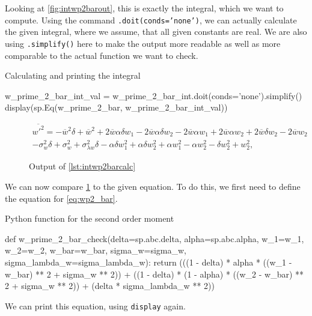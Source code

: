 Looking at \cref{fig:intwp2barout}, this is exactly the integral, which we want to compute.
Using the command \texttt{.doit(conds='none')}, we can actually calculate the given integral, where we assume, that all given constants are real.
We are also using \texttt{.simplify()} here to make the output more readable as well as more comparable to the actual function we want to check.
\begin{listing}[!ht]
    \caption{Calculating and printing the integral}
    \label{lst:intwp2barcalc}
    \begin{pythoncode}
        w_prime_2_bar_int_val = w_prime_2_bar_int.doit(conds='none').simplify()
        display(sp.Eq(w_prime_2_bar, w_prime_2_bar_int_val))
    \end{pythoncode}
\end{listing}
\begin{figure}[!ht]
    \centering
    \caption{Output of \cref{lst:intwp2barcalc}}
    \label{fig:intwp2barcalcout}
    \begin{align}
        \overline{w'^2}
        = - \overline{w}^{2} \delta + \overline{w}^{2} + 2 \overline{w} \alpha \delta w_{1} - 2 \overline{w} \alpha \delta w_{2} - 2 \overline{w} \alpha w_{1} + 2 \overline{w} \alpha w_{2} + 2 \overline{w} \delta w_{2} - 2 \overline{w} w_{2} \nonumber\\
        - \sigma_{w}^{2} \delta + \sigma_{w}^{2} + \sigma_{\lambda w}^{2} \delta - \alpha \delta w_{1}^{2} + \alpha \delta w_{2}^{2} + \alpha w_{1}^{2} - \alpha w_{2}^{2} - \delta w_{2}^{2} + w_{2}^{2} \nonumber,
    \end{align}
\end{figure}
We can now compare \cref{fig:intwp2barcalcout} to the given equation.
To do this, we first need to define the equation for \cref{eq:wp2_bar}.
\begin{listing}[!ht]
    \caption{Python function for the second order moment}
    \label{lst:intwp2barsym}
    \begin{pythoncode}
        def w_prime_2_bar_check(delta=sp.abc.delta, alpha=sp.abc.alpha, w_1=w_1, w_2=w_2,
        w_bar=w_bar, sigma_w=sigma_w, sigma_lambda_w=sigma_lambda_w):
            return (((1 - delta) * alpha * ((w_1 - w_bar) ** 2 + sigma_w ** 2)) 
                + ((1 - delta) * (1 - alpha) * ((w_2 - w_bar) ** 2 + sigma_w ** 2)) 
                + (delta * sigma_lambda_w ** 2))
    \end{pythoncode}
\end{listing}
We can print this equation, using \texttt{display} again.

